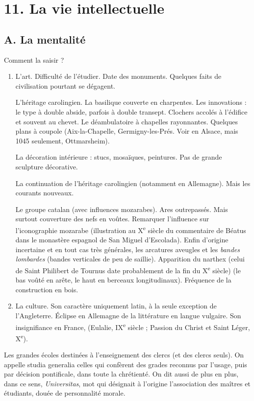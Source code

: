 \documentclass[french,twoside]{book} %
\newcommand\chapteropen{} %
\newcommand\chaptercont{} %
\renewcommand\chapteropen{} %
\renewcommand\chaptercont{} %
\begin{document}
\chapteropen
\chapter[11. La vie intellectuelle]{\textsc{11. }La vie intellectuelle}
\label{c11}

\chaptercont
\section[A. La mentalité]{A. La mentalité}
\label{c11a}
\noindent  {}
\label{p115} Comment la saisir ?\par

\begin{enumerate}[itemsep=\baselineskip,]
\item L’art. Difficulté de l’étudier. Date des monuments. Quelques faits de civilisation pourtant se dégagent.\par
L’héritage carolingien. La basilique couverte en charpentes. Les innovations : le type à double abside, parfois à double transept. Clochers accolés à l’édifice et souvent au chevet. Le déambulatoire à chapelles rayonnantes. Quelques plans à coupole (Aix-la-Chapelle, Germigny-les-Prés. Voir en Alsace, mais 1045 seulement, Ottmarsheim).\par
La décoration intérieure : stucs, mosaïques, peintures. Pas de grande sculpture décorative.\par
La continuation de l’héritage carolingien (notamment en Allemagne). Mais les courants nouveaux.\par
Le groupe catalan (avec influences mozarabes). Ares outrepassés. Mais surtout couverture des nefs en voûtes. Remarquer l’influence sur l’iconographie mozarabe (illustration au X\textsuperscript{e} siècle du commentaire de Béatus dans le monastère espagnol de San Miguel d’Escolada). Enfin d’origine incertaine et en tout cas très générales, les arcatures aveugles et les \emph{bandes lombardes} (bandes verticales de peu de saillie). Apparition du narthex (celui de Saint Philibert de Tournus date probablement de la fin du X\textsuperscript{e} siècle) (le bas voûté en arête, le haut en berceaux longitudinaux). Fréquence de la construction en bois.

\item La culture. Son caractère uniquement latin, à la seule exception de l’Angleterre. Éclipse en Allemagne de la littérature en langue vulgaire. Son insignifiance en France, (Eulalie, IX\textsuperscript{e} siècle ; Passion du Christ et Saint Léger, X\textsuperscript{e}).

\end{enumerate}\noindent Les grandes écoles destinées à l’enseignement des clercs (et des clercs seuls). On appelle {\foreign studia generalia} celles qui confèrent des grades reconnus par l’usage, puis par décision pontificale, dans toute la chrétienté. On dit aussi de plus en plus, dans ce sens, {\itshape Universitas}, mot qui désignait à l’origine l’association des maîtres et étudiants, douée de personnalité morale.
\end{document}
